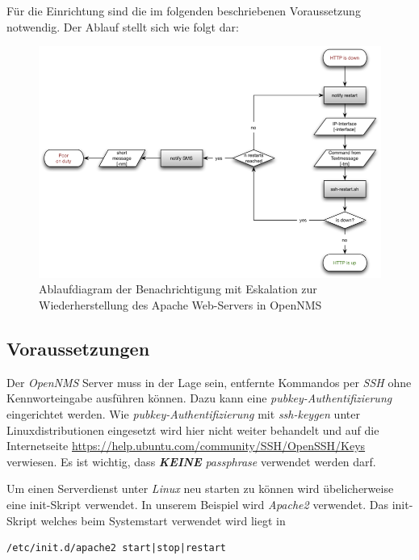 Für die Einrichtung sind die im folgenden beschriebenen Voraussetzung notwendig. Der Ablauf stellt sich wie folgt dar:

\begin{figure}[H]
	\centering
	\includegraphics[width=1.0\textwidth]{images/use-cases/service-recovery/notification-workflow}
	\caption{Ablaufdiagram der Benachrichtigung mit Eskalation zur Wiederherstellung des Apache Web-Servers in OpenNMS}
	\label{pic:workflow-recovery-apache}
\end{figure}

\subsection{Voraussetzungen}
Der \emph{OpenNMS} Server muss in der Lage sein, entfernte Kommandos per \emph{SSH} ohne Kennworteingabe ausführen können. Dazu kann eine \emph{pubkey-Authentifizierung} eingerichtet werden. Wie \emph{pubkey-Authentifizierung} mit \emph{ssh-keygen} unter Linuxdistributionen eingesetzt wird hier nicht weiter behandelt und auf die Internetseite \url{https://help.ubuntu.com/community/SSH/OpenSSH/Keys} verwiesen. Es ist wichtig, dass \textbf{\textit{KEINE}} \emph{passphrase} verwendet werden darf.

Um einen Serverdienst unter \emph{Linux} neu starten zu können wird übelicherweise eine init-Skript verwendet. In unserem Beispiel wird \emph{Apache2} verwendet. Das init-Skript welches beim Systemstart verwendet wird liegt in 

\begin{lstlisting}[numbers=none]
/etc/init.d/apache2 start|stop|restart
\end{lstlisting}

